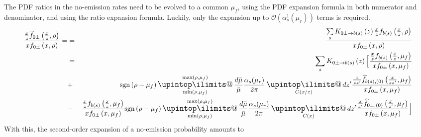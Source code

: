 \documentclass[a4paper,11pt]{article}
\makeatletter
\newcommand{\sgn}[2]{\mathrm{sgn}\left(#1-#2\right)}
\newcommand{\xfhat}[3]{#2 \widehat{f}_{#1}\left(#2, #3\right)}
\newcommand{\xftilde}[3]{#2 \widetilde{f}_{#1}\left(#2, #3\right)}
\newcommand{\xf}[3]{#2 f_{#1}\left(#2, #3\right)}
\newcommand{\pskernel}[3]{K_{#1\rightarrow #2}\left(#3\right)}
\newcommand{\upint}{\DOTSI\upintop\ilimits@}
\renewcommand{\int}{\mathop{\mathlarger{\upint}}}
\makeatother
\begin{document}
The PDF ratios in the no-emission rates need to be evolved to a common $\mu_f$, using the PDF expansion formula in both numerator and denominator, and using
the ratio expansion formula. Luckily, only the expansion up to $\mathcal{O}(\alpha_s^1(\mu_r))$ terms is required.
\begin{eqnarray*}
\frac{\xftilde{0\pm}{\frac{x}{z}}{\rho}}{\xf{0\pm}{x}{\rho}} =
 &=& \frac{\sum\limits_s \pskernel{0\pm}{b(s)}{z}  \xf{b(s)}{\frac{x}{z}}{\rho}}{\xf{0\pm}{x}{\rho}}
\\&=&
\sum\limits_s \pskernel{0\pm}{b(s)}{z} \Big[
 \frac{\xf{b(s)}{\frac{x}{z}}{\mu_f}}{\xf{0\pm}{x}{\mu_f}}
\\&+&
\sgn{\rho}{\mu_f}
\int\displaylimits_{\min(\rho,\mu_f) }^{\max(\rho,\mu_f)}\frac{d\bar\mu}{\bar\mu} \frac{\alpha_s(\mu_r)}{2\pi}
\int\displaylimits_{C(x/z)}  dz' 
\frac{\xfhat{b(s),(0)}{\frac{x}{zz'}}{\mu_f}}{\xf{0\pm}{x}{\mu_f}}
\\&-&
\frac{\xf{b(s)}{\frac{x}{z}}{\mu_f} }{\xf{0\pm}{x}{\mu_f}}
\sgn{\rho}{\mu_f}
\int\displaylimits_{\min(\rho,\mu_f) }^{\max(\rho,\mu_f)}\frac{d\bar\mu}{\bar\mu} \frac{\alpha_s(\mu_r)}{2\pi}
\int\displaylimits_{C(x)}  dz' 
\frac{\xfhat{0\pm,(0)}{\frac{x}{z'}}{\mu_f} }{
\xf{0\pm}{x}{\mu_f} }
\Big]
\end{eqnarray*}
With this, the second-order expansion of a no-emission probability amounts to
\end{document}
